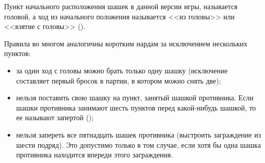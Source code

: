 Пункт начального расположения шашек в данной версии игры, называется головой, а ход из начального положения называется <<из головы>> или <<взятие с головы>> ().


\pagebreak

Правила во многом аналогичны коротким нардам за исключением нескольких пунктов:
\begin{itemize}
    \item за один ход с головы можно брать только одну шашку (исключение составляет первый бросок в партии, в котором можно снять две);
    \item нельзя поставить свою шашку на пункт, занятый шашкой противника. Если шашки противника занимают шесть пунктов перед какой-нибудь шашкой, то ее называют запертой ();
    \item нельзя запереть все пятнадцать шашек противника (выстроить заграждение из шести подряд). Это допустимо только в том случае, если хотя бы одна шашка противника находится впереди этого заграждения.
\end{itemize}


\pagebreak
